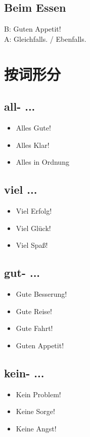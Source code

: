 \subsection{Beim Essen}
B: Guten Appetit! \\
A: Gleichfalls. / Ebenfalls.  \\

\section{按词形分}
\subsection{all- ...}
\begin{itemize}
    \item Alles Gute!
    \item Alles Klar!
    \item Alles in Ordnung
\end{itemize}

\subsection{viel ...} 
\begin{itemize}
    \item Viel Erfolg! 
    \item Viel Glück!
    \item Viel Spaß!
\end{itemize}

\subsection{gut- ...}
\begin{itemize}
    \item Gute Besserung!
    \item Gute Reise!
    \item Gute Fahrt!
    \item Guten Appetit!
\end{itemize}

\subsection{kein- ...}
\begin{itemize}
    \item Kein Problem!
    \item Keine Sorge! 
    \item Keine Angst! 
\end{itemize}

